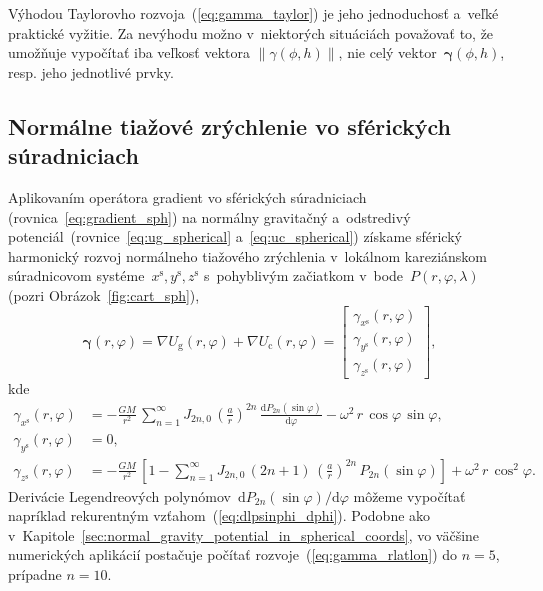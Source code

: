 \documentclass[a4paper, 12pt]{book}
\newcommand{\diff}{\mathrm d}
\newcommand{\gidx}{\mathrm g}
\newcommand{\cidx}{\mathrm c}
\begin{document}
Výhodou Taylorovho rozvoja~(\ref{eq:gamma_taylor}) je jeho jednoduchosť a~veľké 
praktické vyžitie.  Za nevýhodu možno v~niektorých situáciách považovať to, že 
umožňuje vypočítať iba veľkosť vektora $\| \gamma(\phi, h) \|$, nie celý 
vektor~$\boldsymbol \gamma(\phi, h)$, resp. jeho jednotlivé prvky.







\subsection{Normálne tiažové zrýchlenie vo sférických súradniciach}
\label{sec:normal_gravity_in_sph_coords}

Aplikovaním operátora gradient vo sférických súradniciach 
(rovnica~\ref{eq:gradient_sph}) na normálny gravitačný a~odstredivý 
potenciál~(rovnice~\ref{eq:ug_spherical} a~\ref{eq:uc_spherical}) získame 
sférický harmonický rozvoj normálneho tiažového zrýchlenia v~lokálnom 
kareziánskom súradnicovom systéme~$x^\mathrm{s}, y^\mathrm{s}, z^\mathrm{s}$ 
s~pohyblivým začiatkom v~bode~$P(r, \varphi, \lambda)$ (pozri 
Obrázok~\ref{fig:cart_sph}),
%
\begin{equation}
\boldsymbol \gamma(r, \varphi) = \nabla U_\gidx(r, \varphi) + \nabla U_\cidx(r, 
\varphi) =
%
\begin{bmatrix}
\gamma_{x^\mathrm{s}}(r, \varphi)\\
\gamma_{y^\mathrm{s}}(r, \varphi)\\
\gamma_{z^\mathrm{s}}(r, \varphi)
\end{bmatrix}
%
{,}
\end{equation}
%
kde
%
\begin{equation}
\label{eq:gamma_rlatlon}
\begin{split}
\gamma_{x^\mathrm{s}}(r, \varphi) &= -\frac{GM}{r^2} \, \sum_{n = 1}^\infty 
J_{2n,0} \, \left( \frac{a}{r} \right)^{2n} \, \frac{\diff 
P_{2n}(\sin\varphi)}{\diff \varphi} -\omega^2 \, r \, \cos\varphi \, 
\sin\varphi{,}\\
\gamma_{y^\mathrm{s}}(r, \varphi) &= 0{,}\\
\gamma_{z^\mathrm{s}}(r, \varphi) &= -\frac{GM}{r^2} \, \left[ 1 - \sum_{n 
= 1}^{\infty} J_{2n,0} \, (2n + 1) \, \left( \frac{a}{r} \right)^{2n} \, 
P_{2n}(\sin\varphi) \right] + \omega^2 \, r \, \cos^2\varphi{.}
\end{split}
\end{equation}
%
Derivácie Legendreových polynómov~$\diff P_{2n}(\sin\varphi) \slash \diff 
\varphi$ môžeme vypočítať napríklad rekurentným 
vzťahom~(\ref{eq:dlpsinphi_dphi}).  Podobne ako 
v~Kapitole~\ref{sec:normal_gravity_potential_in_spherical_coords}, vo väčšine 
numerických aplikácií postačuje počítať rozvoje~(\ref{eq:gamma_rlatlon}) do $n 
= 5$, prípadne $n = 10$.
\end{document}
